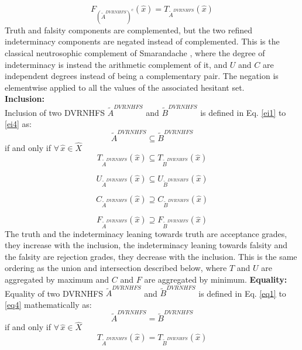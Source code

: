 \documentclass[a4paper]{elsarticle}
\begin{document}
{\begin{equation}
\label{ec4}
F_{(\tilde{A}^{DVRNHFS})^c}(\hat{x})=T_{\tilde{A}^{DVRNHFS}}(\hat{x})
\end{equation}
Truth and falsity components are complemented, but the two refined indeterminacy components are negated instead of complemented. This is the classical neutrosophic complement of Smarandache \cite{Smarandache:1998}, where the degree of indeterminacy is instead the arithmetic complement of it, and $U$ and $C$ are independent degrees instead of being a complementary pair. The negation is elementwise applied to all the values of the associated hesitant set.\\
 \textbf{Inclusion:}\\
 Inclusion of two DVRNHFS $\tilde{A}^{DVRNHFS}$ and $\tilde{B}^{DVRNHFS}$ is defined in Eq. \ref{ei1} to \ref{ei4} as:
 $$\tilde{A}^{DVRNHFS}\subseteq \tilde{B}^{DVRNHFS}$$ if and only if
 $\forall\, \hat{x} \in \hat{X}$
 \begin{equation}
\label{ei1}
{T_{\tilde{A}^{DVRNHFS}}}(\hat{x}) \subseteq {T_{\tilde{B}^{DVRNHFS}}}(\hat{x})
\end{equation}

\begin{equation}
\label{ei2}
{U_{\tilde{A}^{DVRNHFS}}}(\hat{x}) \subseteq {U_{\tilde{B}^{DVRNHFS}}}(\hat{x})
\end{equation}

\begin{equation}
\label{ei3}
{C_{\tilde{A}^{DVRNHFS}}}(\hat{x}) \supseteq {C_{\tilde{B}^{DVRNHFS}}}(\hat{x})
\end{equation}

\begin{equation}
\label{ei4}
{F_{\tilde{A}^{DVRNHFS}}}(\hat{x}) \supseteq {F_{\tilde{B}^{DVRNHFS}}}(\hat{x})
\end{equation}
The truth and the indeterminacy leaning towards truth are acceptance grades, they increase with the inclusion, the indeterminacy leaning towards falsity and the falsity are rejection grades, they decrease with the inclusion. This is the same ordering as the union and intersection described below, where $T$ and $U$ are aggregated by maximum and $C$ and $F$ are aggregated by minimum.
\textbf{Equality:}\\
 Equality of two DVRNHFS $\tilde{A}^{DVRNHFS}$ and $\tilde{B}^{DVRNHFS}$ is defined in Eq. \ref{eq1} to \ref{eq4} mathematically as:
 $$\tilde{A}^{DVRNHFS}= \tilde{B}^{DVRNHFS}$$ if and only if
 $\forall\, \hat{x} \in \hat{X}$
\begin{equation}
\label{eq1}
{T_{\tilde{A}^{DVRNHFS}}}(\hat{x}) = {T_{\tilde{B}^{DVRNHFS}}}(\hat{x})
\end{equation}

}
\end{document}
